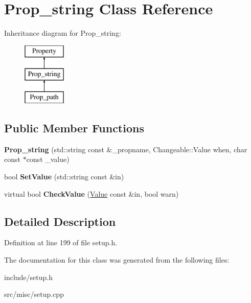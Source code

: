 \hypertarget{classProp__string}{\section{Prop\-\_\-string Class Reference}
\label{classProp__string}
}
Inheritance diagram for Prop\-\_\-string\-:\begin{figure}[H]
\begin{center}
\leavevmode
\includegraphics[height=3.000000cm]{classProp__string}
\end{center}
\end{figure}
\subsection*{Public Member Functions}
\begin{DoxyCompactItemize}
\item 
\hypertarget{classProp__string_ad7cfeff160dad431615b378934fd409f}{{\bfseries Prop\-\_\-string} (std\-::string const \&\-\_\-propname, Changeable\-::\-Value when, char const $\ast$const \-\_\-value)}\label{classProp__string_ad7cfeff160dad431615b378934fd409f}

\item 
\hypertarget{classProp__string_aa0bdbb5d31c417f314d8a4b2b3453ded}{bool {\bfseries Set\-Value} (std\-::string const \&in)}\label{classProp__string_aa0bdbb5d31c417f314d8a4b2b3453ded}

\item 
\hypertarget{classProp__string_ad1fceed071e39d195d2369e1c836ff9a}{virtual bool {\bfseries Check\-Value} (\hyperlink{classValue}{Value} const \&in, bool warn)}\label{classProp__string_ad1fceed071e39d195d2369e1c836ff9a}

\end{DoxyCompactItemize}


\subsection{Detailed Description}


Definition at line 199 of file setup.\-h.



The documentation for this class was generated from the following files\-:\begin{DoxyCompactItemize}
\item 
include/setup.\-h\item 
src/misc/setup.\-cpp\end{DoxyCompactItemize}
